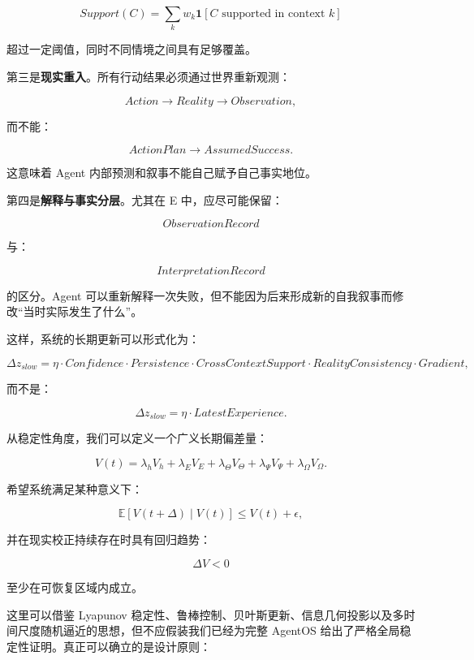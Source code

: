 \[
Support(C)
=
\sum_{k}
w_k
\mathbf{1}
[
C\text{ supported in context }k
]
\]

超过一定阈值，同时不同情境之间具有足够覆盖。

第三是\textbf{现实重入}。所有行动结果必须通过世界重新观测：

\[
Action
\rightarrow
Reality
\rightarrow
Observation,
\]

而不能：

\[
ActionPlan
\rightarrow
AssumedSuccess.
\]

这意味着 Agent 内部预测和叙事不能自己赋予自己事实地位。

第四是\textbf{解释与事实分层}。尤其在 E 中，应尽可能保留：

\[
ObservationRecord
\]

与：

\[
InterpretationRecord
\]

的区分。Agent 可以重新解释一次失败，但不能因为后来形成新的自我叙事而修改“当时实际发生了什么”。

这样，系统的长期更新可以形式化为：

\[
\Delta z_{slow}
=
\eta
\cdot
Confidence
\cdot
Persistence
\cdot
CrossContextSupport
\cdot
RealityConsistency
\cdot
Gradient,
\]

而不是：

\[
\Delta z_{slow}
=
\eta
\cdot
LatestExperience.
\]

从稳定性角度，我们可以定义一个广义长期偏差量：

\[
V(t)
=
\lambda_h V_h
+
\lambda_E V_E
+
\lambda_\Theta V_\Theta
+
\lambda_\Psi V_\Psi
+
\lambda_\Omega V_\Omega.
\]

希望系统满足某种意义下：

\[
\mathbb{E}
[
V(t+\Delta)
\mid
V(t)
]
\leq
V(t)+\epsilon,
\]

并在现实校正持续存在时具有回归趋势：

\[
\Delta V<0
\]

至少在可恢复区域内成立。

这里可以借鉴 Lyapunov 稳定性、鲁棒控制、贝叶斯更新、信息几何投影以及多时间尺度随机逼近的思想，但不应假装我们已经为完整 AgentOS 给出了严格全局稳定性证明。真正可以确立的是设计原则：

\begin{statementbox}
\centering
{}
\end{statementbox}

\begin{statementbox}
\centering
{}
\end{statementbox}

